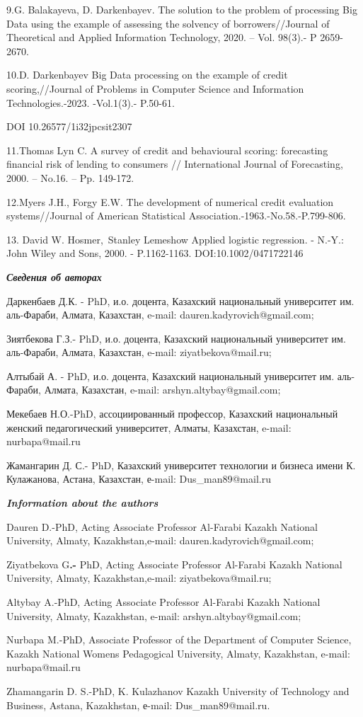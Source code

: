 9.G. Balakayeva, D. Darkenbayev. The solution to the problem of
processing Big Data using the example of assessing the solvency of
borrowers//Journal of Theoretical and Applied Information Technology,
2020. -- Vol. 98(3).- P 2659-2670.

10.D. Darkenbayev Big Data processing on the example of credit
scoring,//Journal of Problems in Computer Science and Information
Technologies.-2023. -Vol.1(3).- P.50-61.

DOI 10.26577/1i32jpcsit2307

11.Thomas Lyn C. A survey of credit and behavioural scoring: forecasting
financial risk of lending to consumers // International Journal of
Forecasting, 2000. -- No.16. -- Pp. 149-172.

12.Myers J.H., Forgy E.W. The development of numerical credit evaluation
systems//Journal of American Statistical
Association.-1963.-No.58.-P.799-806.

13. David W. Hosmer,~Stanley Lemeshow Applied logistic regression. -
N.-Y.: John Wiley and Sons, 2000. - P.1162-1163. DOI:10.1002/0471722146

\emph{{\bfseries Сведения об авторах}}

Даркенбаев Д.К. - PhD, и.о. доцента, Казахский национальный университет
им. аль-Фараби, Алмата, Казахстан, e-mail: dauren.kadyrovich@gmail.com;

Зиятбекова Г.З.- PhD, и.о. доцента, Казахский национальный университет
им. аль-Фараби, Алмата, Казахстан, e-mail: ziyatbekova@mail.ru;

Алтыбай А. - PhD, и.о. доцента, Казахский национальный университет им.
аль-Фараби, Алмата, Казахстан, e-mail: arshyn.altybay@gmail.com;

Мекебаев Н.О.-PhD, ассоциированный профессор, Казахский национальный
женский педагогический университет, Алматы, Казахстан, e-mail:
nurbapa@mail.ru

Жамангарин Д. С.- PhD, Казахский университет технологии и бизнеса имени
К. Кулажанова, Астана, Казахстан, е-mail: Dus\_man89@mail.ru

\emph{{\bfseries Information about the authors}}

Dauren D.-PhD, Acting Associate Professor Al-Farabi Kazakh National
University, Almaty, Kazakhstan,e-mail: dauren.kadyrovich@gmail.com;

Ziyatbekova G{\bfseries .-} PhD, Acting Associate Professor Al-Farabi
Kazakh National University, Almaty, Kazakhstan,e-mail:
ziyatbekova@mail.ru;

Altybay A.-PhD, Acting Associate Professor Al-Farabi Kazakh National
University, Almaty, Kazakhstan, e-mail: arshyn.altybay@gmail.com;

Nurbapa M.-PhD, Associate Professor of the Department of Computer
Science, Kazakh National Women\textquotesingle s Pedagogical University,
Almaty, Kazakhstan, e-mail: nurbapa@mail.ru

Zhamangarin D. S.-PhD, K. Kulazhanov Kazakh University of Technology and
Business, Astana, Kazakhstan, е-mail: Dus\_man89@mail.ru.